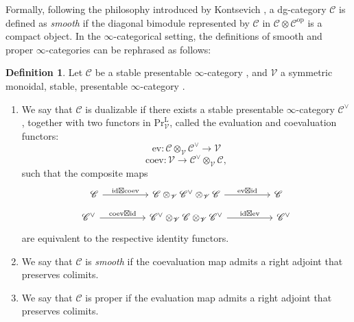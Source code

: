 \documentclass[oneside, hidelinks, 12pt, a4paper,reqno]{amsart}
\theoremstyle{plain}
\theoremstyle{definition}
\newtheorem{definition}[definition]{Definition}
\theoremstyle{plain}
\newcommand{\cC}{\mathscr C}
\newcommand{\cV}{\mathscr V}
\newcommand{\cat}{$\infty$-category }
\newcommand{\cates}{$\infty$-categories }
\newcommand{\LPrV}{\mathrm{Pr}^{\mathrm{L}}_{\cV}}
\newcommand{\otimesV}{\otimes_{\cV}}
\begin{document}
Formally, following the philosophy introduced by Kontsevich \cite{kontsevich1998triangulated}, a dg-category $\mathscr{C}$ is defined as \emph{smooth} if the diagonal bimodule represented by $\mathscr{C}$ in $\mathscr{C}\otimes \mathscr{C}^{\mathrm{op}}$ is a compact object. In the $\infty$-categorical setting, the definitions of smooth and proper \cates can be rephrased as follows:

\begin{definition}\label{def: 0 introduciton}
 Let $\mathscr{C}$ be a stable presentable \cat, and $\mathscr{V}$ a symmetric monoidal, stable, presentable \cat.
\begin{enumerate}
\item We say that $\mathscr{C}$ is dualizable if there exists a stable presentable \cat $\cC^{\vee}$, together with two functors in $\LPrV$, called the evaluation and coevaluation functors:
\begin{equation*}
\mathrm{ev}: \cC \otimesV \cC^{\vee} \to \cV
\end{equation*}
\begin{equation*}
\mathrm{coev}: \cV \to \cC^{\vee} \otimesV \cC,
\end{equation*}
such that the composite maps
\begin{equation}\label{eq: compatibility 1}
\begin{tikzcd}
\cC && {\cC\otimesV \cC^{\vee} \otimesV \cC} && \cC
\arrow["{\mathrm{id}\boxtimes \mathrm{coev}}", from=1-1, to=1-3]
\arrow["{\mathrm{ev} \boxtimes \mathrm{id}}", from=1-3, to=1-5]
\end{tikzcd} 
\end{equation}
\begin{equation}\label{eq: compatibility 2}
\begin{tikzcd}
{\cC^{\vee}} && {\cC^{\vee} \otimesV \cC \otimesV \cC^{\vee}} && {\cC^{\vee}}
\arrow["{\mathrm{coev} \boxtimes \mathrm{id}}", from=1-1, to=1-3]
\arrow["{\mathrm{id} \boxtimes \mathrm{ev}}", from=1-3, to=1-5]
\end{tikzcd}
\end{equation}
are equivalent to the respective identity functors.
\item We say that $\mathscr{C}$ is \emph{smooth} if the coevaluation map admits a right adjoint that preserves colimits.
\item We say that $\mathscr{C}$ is proper if the evaluation map admits a right adjoint that preserves colimits.
\end{enumerate}
\end{definition}
\end{document}
